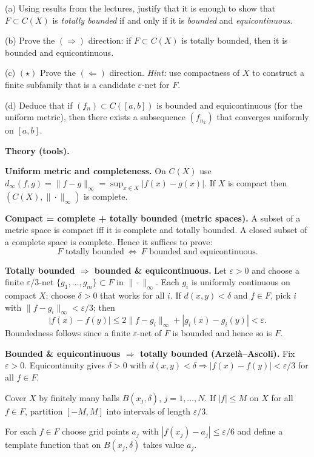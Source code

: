 \documentclass[12pt,a4paper]{article}
\begin{document}
	\medskip
	(a)\; Using results from the lectures, justify that it is enough to show that $F\subset C(X)$ is \emph{totally bounded} if and only if it is \emph{bounded} and \emph{equicontinuous}.
	
	\medskip
	(b)\; Prove the $(\Rightarrow)$ direction: if $F\subset C(X)$ is totally bounded, then it is bounded and equicontinuous.
	
	\medskip
	(c)\; $(\star)$ Prove the $(\Leftarrow)$ direction. \emph{Hint:} use compactness of $X$ to construct a finite subfamily that is a candidate $\varepsilon$-net for $F$.
	
	\medskip
	(d)\; Deduce that if $(f_n)\subset C([a,b])$ is bounded and equicontinuous (for the uniform metric), then there exists a subsequence $(f_{n_k})$ that converges uniformly on $[a,b]$.
	
	\medskip
	\textbf{Theory (tools).}
	
	\textbf{Uniform metric and completeness.}
	On $C(X)$ use $d_\infty(f,g)=\|f-g\|_\infty=\sup_{x\in X}|f(x)-g(x)|$.
	If $X$ is compact then $(C(X),\|\cdot\|_\infty)$ is complete.
	
	\medskip
	\textbf{Compact = complete + totally bounded (metric spaces).}
	A subset of a metric space is compact iff it is complete and totally bounded.
	A closed subset of a complete space is complete.
	Hence it suffices to prove:
	\[
	\boxed{\text{$F$ totally bounded}\ \Longleftrightarrow\ \text{$F$ bounded and equicontinuous.}}
	\]
	
	\medskip
	\textbf{Totally bounded $\Rightarrow$ bounded \& equicontinuous.}
	Let $\varepsilon>0$ and choose a finite $\varepsilon/3$-net $\{g_1,\dots,g_m\}\subset F$ in $\|\cdot\|_\infty$.
	Each $g_i$ is uniformly continuous on compact $X$; choose $\delta>0$ that works for all $i$.
	If $d(x,y)<\delta$ and $f\in F$, pick $i$ with $\|f-g_i\|_\infty<\varepsilon/3$; then
	\[
	|f(x)-f(y)|\le 2\|f-g_i\|_\infty+|g_i(x)-g_i(y)|<\varepsilon.
	\]
	Boundedness follows since a finite $\varepsilon$-net of $F$ is bounded and hence so is $F$.
	
	\medskip
	\textbf{Bounded \& equicontinuous $\Rightarrow$ totally bounded (Arzel\`a–Ascoli).}
	Fix $\varepsilon>0$.
	Equicontinuity gives $\delta>0$ with $d(x,y)<\delta\Rightarrow |f(x)-f(y)|<\varepsilon/3$ for all $f\in F$.
	
	Cover $X$ by finitely many balls $B(x_j,\delta)$, $j=1,\dots,N$.
	If $|f|\le M$ on $X$ for all $f\in F$, partition $[-M,M]$ into intervals of length $\varepsilon/3$.

	For each $f\in F$ choose grid points $a_j$ with $|f(x_j)-a_j|\le \varepsilon/6$ and define a template function that on $B(x_j,\delta)$ takes value $a_j$.
\end{document}
